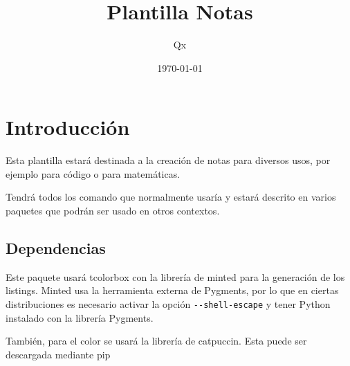 \documentclass{qx-files/qx-notes}
\title{Plantilla Notas}
\author{Qx}
\date{\today}
\begin{document}
  \maketitle


  \chapter{Introducción}

  Esta plantilla estará destinada a la creación de notas para diversos usos, por ejemplo para código o para matemáticas.

  Tendrá todos los comando que normalmente usaría y estará descrito en varios paquetes que podrán ser usado en otros contextos.

  \section{Dependencias}

  Este paquete usará tcolorbox con la librería de minted para la generación de los listings. Minted usa la herramienta externa de Pygments, por lo que en ciertas distribuciones es necesario activar la opción \verb|--shell-escape| y tener Python instalado con la librería Pygments.

  También, para el color se usará la librería de catpuccin. Esta puede ser descargada mediante pip
\end{document}
